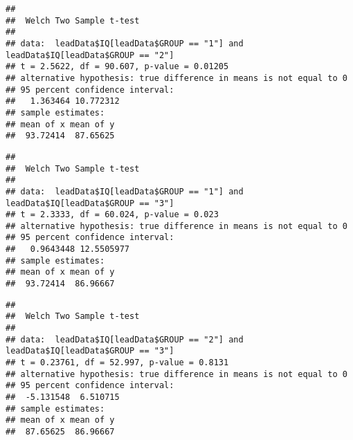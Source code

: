 \documentclass[
]{article}
\newenvironment{Shaded}{\begin{snugshade}}{\end{snugshade}}
\newcommand{\DataTypeTok}[1]{\textcolor[rgb]{0.13,0.29,0.53}{#1}}
\newcommand{\KeywordTok}[1]{\textcolor[rgb]{0.13,0.29,0.53}{\textbf{#1}}}
\newcommand{\NormalTok}[1]{#1}
\newcommand{\OperatorTok}[1]{\textcolor[rgb]{0.81,0.36,0.00}{\textbf{#1}}}
\newcommand{\StringTok}[1]{\textcolor[rgb]{0.31,0.60,0.02}{#1}}
\begin{document}
\begin{verbatim}
## 
##  Welch Two Sample t-test
## 
## data:  leadData$IQ[leadData$GROUP == "1"] and leadData$IQ[leadData$GROUP == "2"]
## t = 2.5622, df = 90.607, p-value = 0.01205
## alternative hypothesis: true difference in means is not equal to 0
## 95 percent confidence interval:
##   1.363464 10.772312
## sample estimates:
## mean of x mean of y 
##  93.72414  87.65625
\end{verbatim}

\begin{Shaded}
\end{Shaded}

\begin{verbatim}
## 
##  Welch Two Sample t-test
## 
## data:  leadData$IQ[leadData$GROUP == "1"] and leadData$IQ[leadData$GROUP == "3"]
## t = 2.3333, df = 60.024, p-value = 0.023
## alternative hypothesis: true difference in means is not equal to 0
## 95 percent confidence interval:
##   0.9643448 12.5505977
## sample estimates:
## mean of x mean of y 
##  93.72414  86.96667
\end{verbatim}

\begin{Shaded}
\end{Shaded}

\begin{verbatim}
## 
##  Welch Two Sample t-test
## 
## data:  leadData$IQ[leadData$GROUP == "2"] and leadData$IQ[leadData$GROUP == "3"]
## t = 0.23761, df = 52.997, p-value = 0.8131
## alternative hypothesis: true difference in means is not equal to 0
## 95 percent confidence interval:
##  -5.131548  6.510715
## sample estimates:
## mean of x mean of y 
##  87.65625  86.96667
\end{verbatim}
\end{document}
